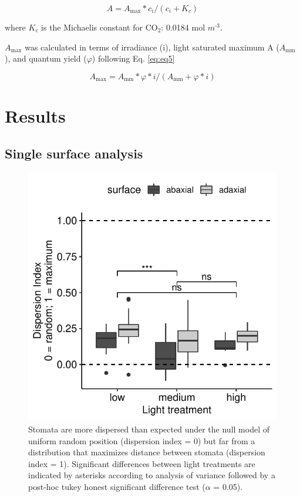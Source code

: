 \documentclass[12pt,halfline,a4paper,]{ouparticle}
\begin{document}
\begin{equation}\label{eq:eq4}
A = A_\text{max} * c_i / (c_i + K_c)
\end{equation}

where \(K_c\) is the Michaelis constant for CO\(_2\): 0.0184 mol
\(m^\text{-3}\).

\(A_\text{max}\) was calculated in terms of irradiance (i), light
saturated maximum A (\(A_\text{mm}\)), and quantum yield (\(\varphi\))
following Eq. \ref{eq:eq5}

\begin{equation}\label{eq:eq5}
A_\text{max} = A_\text{mm} * \varphi * i / (A_\text{mm} + \varphi * i)
\end{equation}

\hypertarget{results}{%
\section{Results}\label{results}}

\hypertarget{single-surface-analysis}{%
\subsection{Single surface analysis}\label{single-surface-analysis}}

\begin{figure}[ht]
\includegraphics[width=\textwidth]{figures/single-surface.pdf}
\caption{Stomata are more dispersed than expected under the null model of uniform random position (dispersion index = 0) but far from a distribution that maximizes distance between stomata (dispersion index = 1). Significant differences between light treatments are indicated by asterisks according to analysis of variance followed by a post-hoc tukey honest significant difference test ($\alpha$ = 0.05).}
\label{fig:dispersion}
\end{figure}
\end{document}
